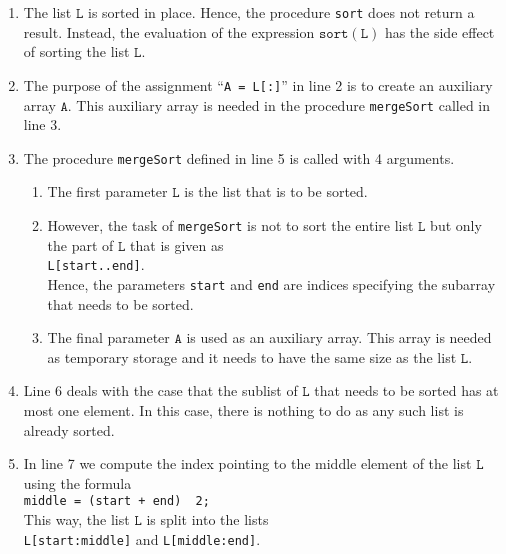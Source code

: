 \begin{enumerate}
\item The list $\mathtt{L}$ is sorted in place. Hence, the procedure 
      \texttt{sort} does not return a result.  Instead, the evaluation of the expression
      $\mathtt{sort}(\mathtt{L})$ has the side effect of sorting the list $\mathtt{L}$.
\item The purpose of the assignment ``\texttt{A = L[:]}'' in line 2 is to create an auxiliary array
      $\texttt{A}$.  This auxiliary array is needed in the procedure
      \texttt{mergeSort} called in line 3.
\item The procedure \texttt{mergeSort} defined in line 5 is called with 4 arguments.
      \begin{enumerate}
      \item The first parameter $\texttt{L}$ is the list that is to be sorted.
      \item However, the task of \texttt{mergeSort} is not to sort the entire list $\texttt{L}$ but only
            the part of $\texttt{L}$ that is given as
            \\[0.2cm]
            \hspace*{1.3cm} 
            \texttt{L[start..end]}. 
            \\[0.2cm]
            Hence, the parameters \texttt{start} and \texttt{end} are indices specifying the 
            subarray that needs to be sorted.
      \item The final parameter $\texttt{A}$ is used as an auxiliary array.  This array is needed
            as temporary storage and it needs to have the same size as the list $\texttt{L}$.
      \end{enumerate} 
\item Line 6 deals with the case that the sublist of $\texttt{L}$ that needs to be sorted has at most one element.  
      In this case, there is nothing to do as any such list is already sorted.
\item In line 7 we compute the index pointing to the middle element of the list $\texttt{L}$ using the
      formula \\[0.2cm]
      \hspace*{1.3cm} 
      \texttt{middle = (start + end) \dv\  2;} 
      \\[0.2cm]
      This way, the list $\texttt{L}$ is split into the lists 
      \\[0.2cm]
      \hspace*{1.3cm}
      \texttt{L[start:middle]} \quad and \quad \texttt{L[middle:end]}.

\end{enumerate}

